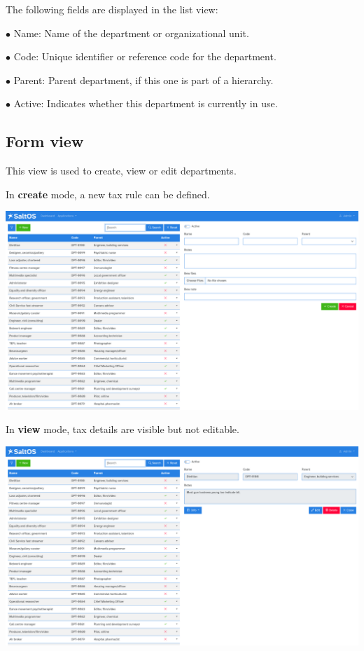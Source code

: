 \documentclass[a4paper]{article}
\begin{document}
The following fields are displayed in the list view:

\begin{compactitem}
\item[\color{myblue}$\bullet$] Name: Name of the department or organizational unit.
\item[\color{myblue}$\bullet$] Code: Unique identifier or reference code for the department.
\item[\color{myblue}$\bullet$] Parent: Parent department, if this one is part of a hierarchy.
\item[\color{myblue}$\bullet$] Active: Indicates whether this department is currently in use.
\end{compactitem}

\hypertarget{toc104}{}
\subsection{Form view}

This view is used to create, view or edit departments.

In \textbf{create} mode, a new tax rule can be defined.

\begin{center}\includegraphics[width=1\textwidth]{../ujest/snaps/test-screenshots-js-screenshots-hr-departments-create-en-us-1-snap.png}\end{center}

In \textbf{view} mode, tax details are visible but not editable.

\begin{center}\includegraphics[width=1\textwidth]{../ujest/snaps/test-screenshots-js-screenshots-hr-departments-view-100-en-us-1-snap.png}\end{center}
\end{document}
